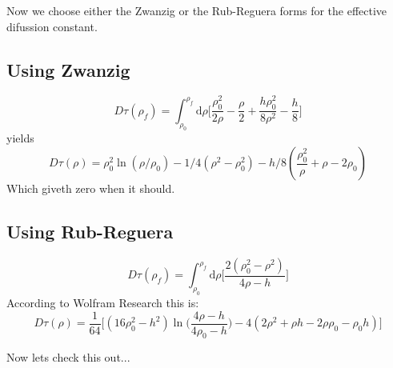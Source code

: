 \documentclass[letterpaperr,12pt]{article}
\newcommand{\rd}{\!\mathrm{d}}
\begin{document}
Now we choose either the Zwanzig or the Rub-Reguera forms for the 
effective difussion constant. 

\subsection{Using Zwanzig}

\begin{equation}
D \tau(\rho_f)= 
\int_{\rho_0}^{\rho_f} \rd \rho \biggl[ 
\frac{\rho_0^2}{2\rho}-\frac{\rho}{2}
+\frac{ h \rho_0^2}{8\rho^2}-\frac{h}{8}\biggr]
\end{equation}
yields
\begin{equation}
D \tau(\rho)=
\rho_0^2\ln(\rho/\rho_0)-1/4(\rho^2-\rho_0^2)
-h/8(\frac{\rho_0^2}{\rho}+\rho-2\rho_0)
\end{equation}
Which giveth zero when it should.

\subsection{Using Rub-Reguera}

\begin{equation}
D \tau(\rho_f)= 
\int_{\rho_0}^{\rho_f} \rd \rho \biggl[ 
\frac{2(\rho_0^2 -\rho^2)}{4\rho-h} \biggr]
\end{equation}
According to Wolfram Research this is:
\begin{equation}
D \tau(\rho)=
\frac{1}{64}\biggl[
(16\rho_0^2-h^2) \ln \biggl(\frac{4\rho-h}{4\rho_0-h}\biggr)
-4(2\rho^2+\rho h -2 \rho \rho_0 -\rho_0 h) 
\biggr]
\end{equation}

Now lets check this out...
\end{document}

